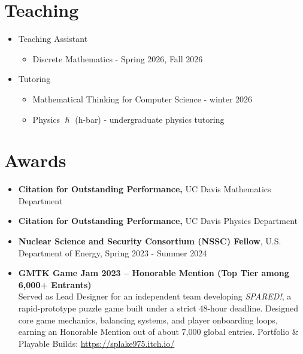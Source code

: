 \documentclass{curriculum-vitae}
\begin{document}
\section{Teaching}
\begin{itemize}
  \item Teaching Assistant
    \begin{itemize}
      \item Discrete Mathematics - Spring 2026, Fall 2026
    \end{itemize}
  \item Tutoring
    \begin{itemize}
      \item Mathematical Thinking for Computer Science - winter 2026
      \item Physics \(\hslash\) (h-bar) - undergraduate physics tutoring
    \end{itemize}
\end{itemize}







\section*{Awards}
\begin{itemize}
  \item \textbf{Citation for Outstanding Performance,} UC Davis Mathematics Department
  \item \textbf{Citation for Outstanding Performance,} UC Davis Physics Department
  \item \textbf{Nuclear Science and Security Consortium (NSSC) Fellow}, U.S. Department of Energy, Spring 2023 - Summer 2024
  \item \textbf{GMTK Game Jam 2023 -- Honorable Mention (Top Tier among 6,000+ Entrants)}\\
    Served as Lead Designer for an independent team developing \emph{SPARED!}, a rapid-prototype puzzle game built under a strict 48-hour deadline. Designed core game mechanics, balancing systems, and player onboarding loops, earning an Honorable Mention out of about 7,000 global entries.
    \newline Portfolio \& Playable Builds: \url{https://splake975.itch.io/}
\end{itemize}
\end{document}
